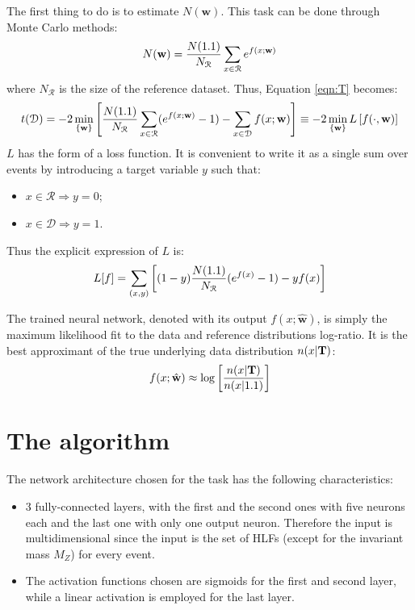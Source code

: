 The first thing to do is to estimate $N(\mathbf{w})$. This task can be done through Monte Carlo methods:
\begin{equation}
	N(\mathbf{w}) = \frac{N(1.1)}{N_{\mathcal{R}}} \sum_{x \in \mathcal{R}} e^{f(x;\mathbf{w})}
\end{equation}
where $N_\mathcal{R}$ is the size of the reference dataset. Thus, Equation \ref{eqn:T} becomes:
\begin{equation}
	t(\mathcal{D}) = -2 \min_{\{\mathbf{w}\}}{\left[
	\frac{N(1.1)}{N_{\mathcal{R}}} \sum_{x \in \mathcal{R}} (e^{f(x;\mathbf{w})} -1) -
	\sum_{x \in \mathcal{D}} f(x;\mathbf{w})
	\right]}
	\equiv
	-2 \min_{\{\mathbf{w}\}}{L \left[ f(\cdot,\mathbf{w}) \right]}
\end{equation}
$L$ has the form of a loss function. It is convenient to write it as a single sum over events by introducing a target variable $y$ such that:
\begin{itemize}
	\item $x \in \mathcal{R} \Longrightarrow y=0$;
	\item $x \in \mathcal{D} \Longrightarrow y=1$.
\end{itemize}
Thus the explicit expression of $L$ is:
\begin{equation}
	L[f] = \sum_{(x,y)} \left[
	(1-y) \frac{N(1.1)}{N_{\mathcal{R}}} (e^{f(x)} - 1) - yf(x)
	\right]	\label{eqn:LOSS}
\end{equation}

The trained neural network, denoted with its output $f(x;\hat{\mathbf{w}})$, is simply the maximum likelihood fit to the data and reference distributions log-ratio. It is the best approximant of the true underlying data distribution $n(x|\text{\textbf{T}})$:
\begin{equation}
	f(x;\hat{\mathbf{w}}) \approx \log{ \left[
	\frac{n(x|\text{\textbf{T}})}{n(x|1.1)}
	\right] }
\end{equation}


\section{The algorithm}
The network architecture chosen for the task has the following characteristics:
\begin{itemize}
	\item 3 fully-connected layers, with the first and the second ones with five neurons each and the last one with only one output neuron. Therefore the input is multidimensional since the input is the set of HLFs (except for the invariant mass $M_{Z}$) for every event.
	\item The activation functions chosen are sigmoids for the first and second layer, while a linear activation is employed for the last layer.
\end{itemize}

